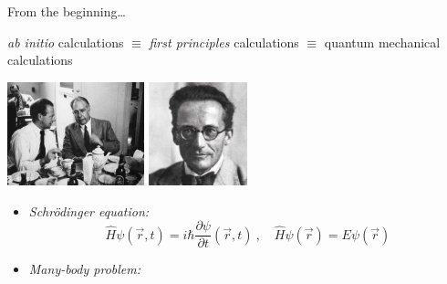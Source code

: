 \documentclass[noamsthm,8pt,t,xcolor={dvipsnames}]{beamer}
\begin{document}
\begin{frame}{From the beginning\dots}
   \begin{block}{}
     \textit{\emph{ab initio}} calculations $\equiv$ \emph{first principles} calculations $\equiv$ quantum mechanical calculations
   \end{block}
   \vspace{0.4cm}
 
   \pause 
   \hspace{2cm}\includegraphics[height=3cm]{figures/heisenberg_bohr.jpg}\hspace{0.5cm}
   \includegraphics[height=3cm]{figures/schrodinger.jpg}

\begin{itemize}
  \item<2-> \emph{Schrödinger equation:}\vspace*{-2mm} $$\hat H\psi(\vec r,t)=i\hbar\frac{\partial\psi}{\partial t}(\vec r, t)\ ,\quad \hat H\psi(\vec r)=E\psi(\vec r)$$
  \item<3-> \emph{Many-body problem:}\vspace*{-2mm} 
   \vspace{-0.8cm}
\end{itemize}
\end{frame}
\end{document}

